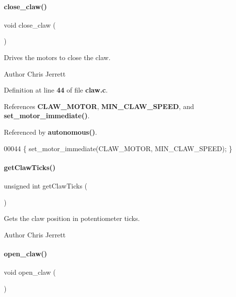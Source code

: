 \paragraph{close\+\_\+claw()}
{\footnotesize\ttfamily void close\+\_\+claw (\begin{DoxyParamCaption}{ }\end{DoxyParamCaption})}



Drives the motors to close the claw. 

\begin{DoxyAuthor}{Author}
Chris Jerrett 
\end{DoxyAuthor}


Definition at line \textbf{ 44} of file \textbf{ claw.\+c}.



References \textbf{ C\+L\+A\+W\+\_\+\+M\+O\+T\+OR}, \textbf{ M\+I\+N\+\_\+\+C\+L\+A\+W\+\_\+\+S\+P\+E\+ED}, and \textbf{ set\+\_\+motor\+\_\+immediate()}.



Referenced by \textbf{ autonomous()}.


\begin{DoxyCode}
00044 \{ set_motor_immediate(CLAW_MOTOR, MIN_CLAW_SPEED); \}
\end{DoxyCode}
\mbox{\label{a00008_addd2004effae7c94400aed1fe6a90ead}} 
\paragraph{get\+Claw\+Ticks()}
{\footnotesize\ttfamily unsigned int get\+Claw\+Ticks (\begin{DoxyParamCaption}{ }\end{DoxyParamCaption})}



Gets the claw position in potentiometer ticks. 

\begin{DoxyAuthor}{Author}
Chris Jerrett 
\end{DoxyAuthor}
\mbox{\label{a00008_a03023ca28f671b9fa7bac07782ccd8c1}} 
\paragraph{open\+\_\+claw()}
{\footnotesize\ttfamily void open\+\_\+claw (\begin{DoxyParamCaption}{ }\end{DoxyParamCaption})}



